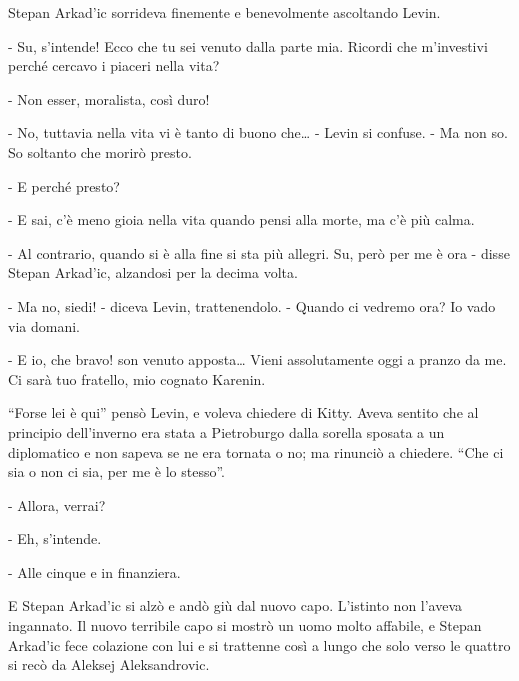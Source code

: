 Stepan Arkad'ic sorrideva finemente e benevolmente ascoltando Levin. 

- Su, s'intende! Ecco che tu sei venuto dalla parte mia. Ricordi che m'investivi perché cercavo i piaceri nella vita? 

- Non esser, moralista, così duro! 

- No, tuttavia nella vita vi è tanto di buono che\ldots{} - Levin si confuse. - Ma non so. So soltanto che morirò presto. 

- E perché presto? 

- E sai, c'è meno gioia nella vita quando pensi alla morte, ma c'è più calma. 

- Al contrario, quando si è alla fine si sta più allegri. Su, però per me è ora - disse Stepan Arkad'ic, alzandosi per la decima volta. 

- Ma no, siedi! - diceva Levin, trattenendolo. - Quando ci vedremo ora? Io vado via domani. 

- E io, che bravo! son venuto apposta\ldots{} Vieni assolutamente oggi a pranzo da me. Ci sarà tuo fratello, mio cognato Karenin. 

``Forse lei è qui'' pensò Levin, e voleva chiedere di Kitty. Aveva sentito che al principio dell'inverno era stata a Pietroburgo dalla sorella sposata a un diplomatico e non sapeva se ne era tornata o no; ma rinunciò a chiedere. ``Che ci sia o non ci sia, per me è lo stesso''. 

- Allora, verrai? 

- Eh, s'intende. 

- Alle cinque e in finanziera. 

E Stepan Arkad'ic si alzò e andò giù dal nuovo capo. L'istinto non l'aveva ingannato. Il nuovo terribile capo si mostrò un uomo molto affabile, e Stepan Arkad'ic fece colazione con lui e si trattenne così a lungo che solo verso le quattro si recò da Aleksej Aleksandrovic. 

